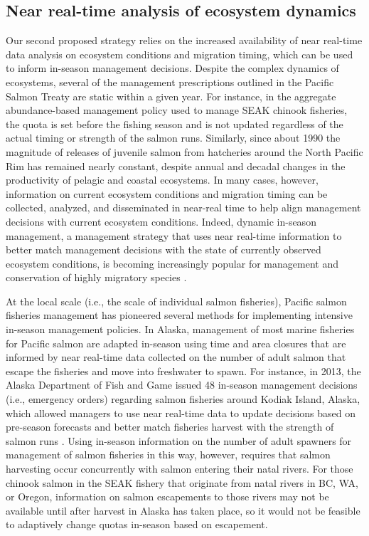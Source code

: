 \subsection{Near real-time analysis of ecosystem dynamics}

Our second proposed strategy relies on the increased availability of near
real-time data analysis on ecosystem conditions and migration timing, which can
be used to inform in-season management decisions. Despite the complex dynamics
of ecosystems, several of the management prescriptions outlined in the Pacific
Salmon Treaty are static within a given year. For instance, in the aggregate
abundance-based management policy used to manage SEAK chinook fisheries, the
quota is set before the fishing season and is not updated regardless of the
actual timing or strength of the salmon runs. Similarly, since about 1990 the
magnitude of releases of juvenile salmon from hatcheries around the North
Pacific Rim has remained nearly constant, despite annual and decadal changes in
the productivity of pelagic and coastal ecosystems. In many cases, however,
information on current ecosystem conditions and migration timing can be
collected, analyzed, and disseminated in near-real time to help align management
decisions with current ecosystem conditions. Indeed, dynamic in-season
management, a management strategy that uses near real-time information to better
match management decisions with the state of currently observed ecosystem
conditions, is becoming increasingly popular for management and conservation of
highly migratory species \citep{Maxwell2015, Lewison2015}.

At the local scale (i.e., the scale of individual salmon fisheries), Pacific
salmon fisheries management has pioneered several methods for implementing
intensive in-season management policies. In Alaska, management of most marine
fisheries for Pacific salmon are adapted in-season using time and area closures
that are informed by near real-time data collected on the number of adult salmon
that escape the fisheries and move into freshwater to spawn. For instance, in
2013, the Alaska Department of Fish and Game issued 48 in-season management
decisions (i.e., emergency orders) regarding salmon fisheries around Kodiak
Island, Alaska, which allowed managers to use near real-time data to update
decisions based on pre-season forecasts and better match fisheries harvest with
the strength of salmon runs \citep{Jackson2013}. Using in-season information on
the number of adult spawners for management of salmon fisheries in this way,
however, requires that salmon harvesting occur concurrently with salmon entering
their natal rivers. For those chinook salmon in the SEAK fishery that originate
from natal rivers in BC, WA, or Oregon, information on salmon escapements to
those rivers may not be available until after harvest in Alaska has taken place,
so it would not be feasible to adaptively change quotas in-season based on
escapement.

